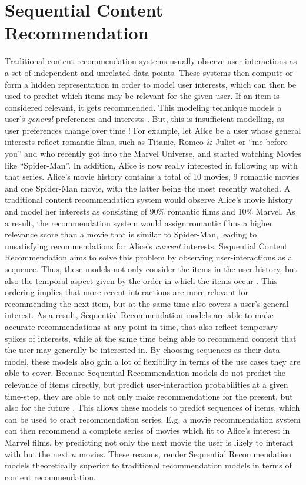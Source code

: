 \documentclass{Academic}
\begin{document}
    \section{Sequential Content Recommendation}\label{sec:seq_recom}
    Traditional content recommendation systems usually observe user interactions as a set of independent and unrelated data points. These systems then compute or form a hidden representation in order to model user interests, which can then be used to predict which items may be relevant for the given user. If an item is considered relevant, it gets recommended. This modeling technique models a user's \textit{general} preferences and interests \cite{wangSequentialRecommenderSystems2019}. But, this is insufficient modelling, as user preferences change over time \cite{wangSequentialRecommenderSystems2019}! For example, let Alice be a user whose general interests reflect romantic films, such as Titanic, Romeo \& Juliet or \enquote{me before you} and who recently got into the Marvel Universe, and started watching Movies like \enquote{Spider-Man}. In addition, Alice is now really interested in following up with that series. Alice's movie history contains a total of 10 movies, 9 romantic movies and one Spider-Man movie, with the latter being the most recently watched. A traditional content recommendation system would observe Alice's movie history and model her interests as consisting of 90\% romantic films and 10\% Marvel. As a result, the recommendation system would assign romantic films a higher relevance score than a movie that is similar to Spider-Man, leading to unsatisfying recommendations for Alice's \textit{current} interests. Sequential Content Recommendation aims to solve this problem by observing user-interactions as a sequence. Thus, these models not only consider the items in the user history, but also the temporal aspect given by the order in which the items occur \cite{wangSequentialRecommenderSystems2019}. This ordering implies that more recent interactions are more relevant for recommending the next item, but at the same time also covers a user's general interest. As a result, Sequential Recommendation models are able to make accurate recommendations at any point in time, that also reflect temporary spikes of interests, while at the same time being able to recommend content that the user may generally be interested in. By choosing sequences as their data model, these models also gain a lot of flexibility in terms of the use cases they are able to cover. Because Sequential Recommendation models do not predict the relevance of items directly, but predict user-interaction probabilities at a given time-step, they are able to not only make recommendations for the present, but also for the future \cite{wangSequentialRecommenderSystems2019}. This allows these models to predict sequences of items, which can be used to craft recommendation series. E.g. a movie recommendation system can then recommend a complete series of movies which fit to Alice's interest in Marvel films, by predicting not only the next movie the user is likely to interact with but the next $n$ movies. These reasons, render Sequential Recommendation models theoretically superior to traditional recommendation models in terms of content recommendation. \\
\end{document}
